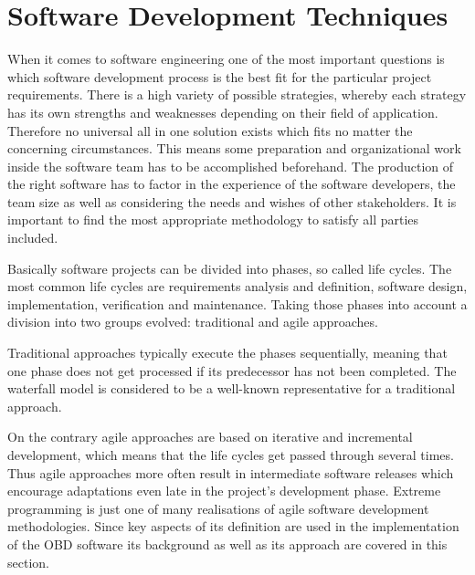 
\chapter{Software Development Techniques}

When it comes to software engineering one of the most important questions is which software development process 
is the best fit for the particular project requirements. There is a high variety of possible strategies, whereby 
each strategy has its own strengths and weaknesses depending on their field of application. Therefore no universal 
all in one solution exists which fits no matter the concerning circumstances. This means some preparation and 
organizational work inside the software team has to be accomplished beforehand. The production of the right software 
has to factor in the experience of the software developers, the team size as well as considering the needs and wishes 
of other stakeholders. It is important to find the most appropriate methodology to satisfy all parties included.

Basically software projects can be divided into phases, so called life cycles. The most common life cycles are 
requirements analysis and definition, software design, implementation, verification and maintenance. Taking those 
phases into account a division into two groups evolved: traditional and agile approaches.

Traditional approaches typically execute the phases sequentially, meaning that one phase does not get processed if 
its predecessor has not been completed. The waterfall model is considered to be a well-known representative for a traditional approach.


On the contrary agile approaches are based on iterative and incremental development, which means that the life cycles 
get passed through several times. Thus agile approaches more often result in intermediate software releases which 
encourage adaptations even late in the project’s development phase. Extreme programming is just one of many realisations 
of agile software development methodologies. Since key aspects of its definition are used in the implementation of the OBD 
software its background as well as its approach are covered in this section. 

